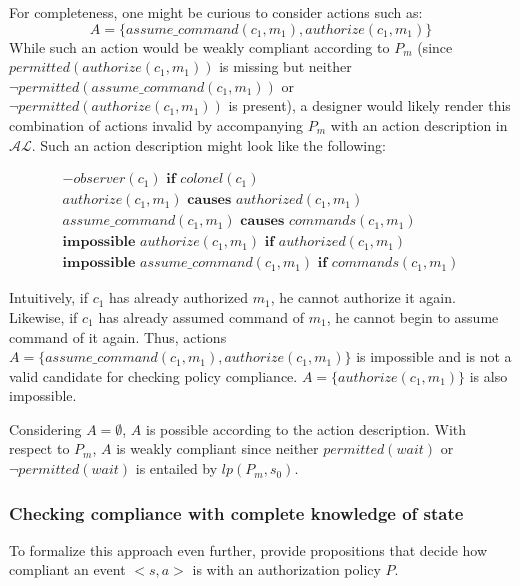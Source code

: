 For completeness, one might be curious to consider actions such as:
\[
A = \{assume\_command(c_1, m_1), authorize(c_1, m_1)\}
\]
While such an action would be weakly compliant according to $P_m$ (since $permitted(authorize(c_1, m_1))$ is missing but neither $\neg permitted(assume\_command(c_1, m_1))$ or $\neg permitted(authorize(c_1, m_1))$ is present), a designer would likely render this combination of actions invalid by accompanying $P_m$ with an action description in $\mathcal{AL}$.
Such an action description might look like the following:

\begin{gather}
    -observer(c_1) \textbf{ if } colonel(c_1) \label{eq:apl_action_description_5} \\
    authorize(c_1, m_1) \textbf{ causes } authorized(c_1, m_1) \label{eq:apl_action_description_1} \\
    assume\_command(c_1, m_1) \textbf{ causes } commands(c_1, m_1) \label{eq:apl_action_description_2} \\
    \textbf{impossible } authorize(c_1, m_1) \textbf{ if } authorized(c_1, m_1) \label{eq:apl_action_description_3} \\
    \textbf{impossible } assume\_command(c_1, m_1) \textbf{ if } commands(c_1, m_1) \label{eq:apl_action_description_4}
\end{gather}

Intuitively, if $c_1$ has already authorized $m_1$, he cannot authorize it again.
Likewise, if $c_1$ has already assumed command of $m_1$, he cannot begin to assume command of it again.
Thus, actions $A = \{assume\_command(c_1, m_1), authorize(c_1, m_1)\}$ is impossible and is not a valid candidate for checking policy compliance.
$A = \{authorize(c_1, m_1)\}$ is also impossible.

Considering $A=\emptyset$, $A$ is possible according to the action description.
With respect to $P_m$, $A$ is weakly compliant since neither $permitted(wait)$ or $\neg permitted(wait)$ is entailed by $lp(P_m, s_0)$.

\subsubsection{Checking compliance with complete knowledge of state}

To formalize this approach even further, \citet{gelfond_authorization_2008} provide propositions that decide how compliant an event $<s,a>$ is with an authorization policy $P$.

